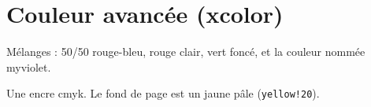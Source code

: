 \documentclass{article}
\begin{document}
\hsize=380pt
\pagecolor{yellow!20}
\section{Couleur avanc\'ee (xcolor)}
M\'elanges : \textcolor{red!50!blue}{50/50 rouge-bleu},
\textcolor{red!25}{rouge clair}, \textcolor{green!60!black}{vert fonc\'e},
et la couleur nomm\'ee \textcolor{myviolet}{myviolet}.

Une \textcolor{encre}{encre cmyk}.
Le fond de page est un jaune p\^ale (\texttt{yellow!20}).
\end{document}
